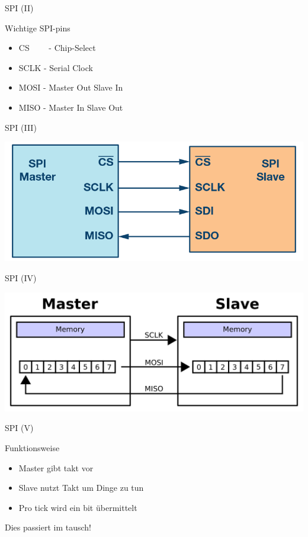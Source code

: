   \begin{frame} {SPI (II)}
    \begin{block} {Wichtige SPI-pins}
      \begin{itemize}
        \item CS ~~~~- Chip-Select
        \item SCLK - Serial Clock
        \item MOSI - Master Out Slave In
        \item MISO - Master In Slave Out
      \end{itemize}
    \end{block}
  \end{frame}

  \begin{frame} {SPI (III)}
    \begin{center}
      \includegraphics[width=.8\textwidth]{SPI-single.png}
    \end{center}
  \end{frame}

  \begin{frame} {SPI (IV)}
    \begin{center}
      \includegraphics[width=\textwidth]{SPI-transfer}
    \end{center}
  \end{frame}

  \begin{frame} {SPI (V)}
   \begin{block} {Funktionsweise}
      \begin{itemize}
        \item Master gibt takt vor
        \item Slave nutzt Takt um Dinge zu tun
        \item Pro tick wird ein bit übermittelt
      \end{itemize}
    \end{block}
    \begin{alertblock} {}
      Dies passiert im tausch!
    \end{alertblock}
  \end{frame}

